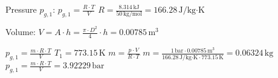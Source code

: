 Pressure \( p_{g,1} \):  
\( p_{g,1} = \frac{R \cdot T}{V} \)  
\( R = \frac{8.314 \, \text{kJ}}{50 \, \text{kg/mol}} = 166.28 \, \text{J/kg·K} \)  

Volume: \( V = A \cdot h = \frac{\pi \cdot D^2}{4} \cdot h = 0.00785 \, \text{m}^3 \)  

\( p_{g,1} = \frac{m \cdot R \cdot T}{V} \)  
\( T_1 = 773.15 \, \text{K} \)  
\( m = \frac{p \cdot V}{R \cdot T} \)  
\( m = \frac{1 \, \text{bar} \cdot 0.00785 \, \text{m}^3}{166.28 \, \text{J/kg·K} \cdot 773.15 \, \text{K}} = 0.06324 \, \text{kg} \)  
\( p_{g,1} = \frac{m \cdot R \cdot T}{V} = 3.92229 \, \text{bar} \)